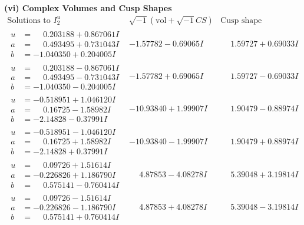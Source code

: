 \documentclass[1p]{elsarticle_modified}
\theoremstyle{definition}
\newcommand{\I}{\sqrt{-1}}
\begin{document}
\newpage\flushleft \textbf{(vi) Complex Volumes and Cusp Shapes}
$$\begin{array}{c|c|c}  
\text{Solutions to }I^u_{2}& \I (\text{vol} + \sqrt{-1}CS) & \text{Cusp shape}\\
 \hline 
\begin{aligned}
u &= \phantom{-}0.203188 + 0.867061 I \\
a &= \phantom{-}0.493495 + 0.731043 I \\
b &= -1.040350 + 0.204005 I\end{aligned}
 & -1.57782 - 0.69065 I & \phantom{-}1.59727 + 0.69033 I \\ \hline\begin{aligned}
u &= \phantom{-}0.203188 - 0.867061 I \\
a &= \phantom{-}0.493495 - 0.731043 I \\
b &= -1.040350 - 0.204005 I\end{aligned}
 & -1.57782 + 0.69065 I & \phantom{-}1.59727 - 0.69033 I \\ \hline\begin{aligned}
u &= -0.518951 + 1.046120 I \\
a &= \phantom{-}0.16725 - 1.58982 I \\
b &= -2.14828 - 0.37991 I\end{aligned}
 & -10.93840 + 1.99907 I & \phantom{-}1.90479 - 0.88974 I \\ \hline\begin{aligned}
u &= -0.518951 - 1.046120 I \\
a &= \phantom{-}0.16725 + 1.58982 I \\
b &= -2.14828 + 0.37991 I\end{aligned}
 & -10.93840 - 1.99907 I & \phantom{-}1.90479 + 0.88974 I \\ \hline\begin{aligned}
u &= \phantom{-}0.09726 + 1.51614 I \\
a &= -0.226826 + 1.186790 I \\
b &= \phantom{-}0.575141 - 0.760414 I\end{aligned}
 & \phantom{-}4.87853 - 4.08278 I & \phantom{-}5.39048 + 3.19814 I \\ \hline\begin{aligned}
u &= \phantom{-}0.09726 - 1.51614 I \\
a &= -0.226826 - 1.186790 I \\
b &= \phantom{-}0.575141 + 0.760414 I\end{aligned}
 & \phantom{-}4.87853 + 4.08278 I & \phantom{-}5.39048 - 3.19814 I \\ \hline\begin{aligned}

\end{aligned}
\end{array}$$
\end{document}

